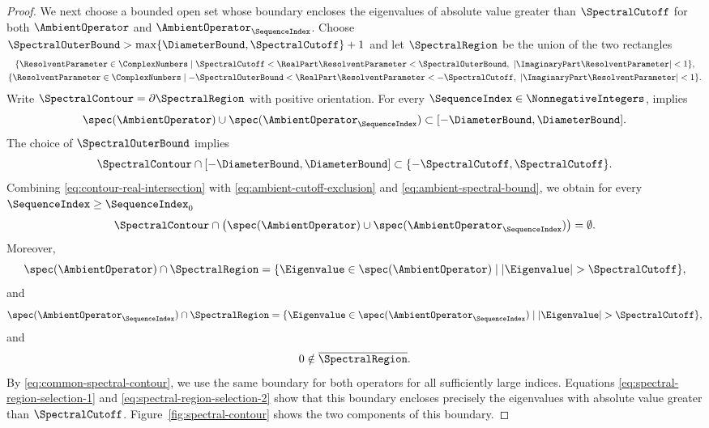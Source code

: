 \begin{proof}
We next choose a bounded open set whose boundary encloses the eigenvalues of absolute
value greater than
$\SpectralCutoff$
for both
$\AmbientOperator$
and
$\AmbientOperator_\SequenceIndex$.
Choose
$\SpectralOuterBound >\max\{\DiameterBound ,\SpectralCutoff \}+1$
and let
$\SpectralRegion $
be the union of the two rectangles
\[
 \begin{gathered}
 \{\ResolventParameter \in\ComplexNumbers\mid \SpectralCutoff <\RealPart \ResolventParameter <\SpectralOuterBound ,\ |\ImaginaryPart \ResolventParameter |<1\},\\
 \{\ResolventParameter \in\ComplexNumbers\mid-\SpectralOuterBound <\RealPart \ResolventParameter <-\SpectralCutoff ,\ |\ImaginaryPart \ResolventParameter |<1\}.
 \end{gathered}
\]
Write
$\SpectralContour =\partial\SpectralRegion $
with positive orientation.
For every
$\SequenceIndex\in\NonnegativeIntegers$,
 implies
\begin{equation}\label{eq:ambient-spectral-bound}
 \spec(\AmbientOperator)\cup\spec(\AmbientOperator_\SequenceIndex)
 \subset[-\DiameterBound,\DiameterBound].
\end{equation}
The choice of
$\SpectralOuterBound$
implies
\begin{equation}\label{eq:contour-real-intersection}
 \SpectralContour\cap[-\DiameterBound,\DiameterBound]
 \subset\{-\SpectralCutoff,\SpectralCutoff\}.
\end{equation}
Combining \eqref{eq:contour-real-intersection} with \eqref{eq:ambient-cutoff-exclusion}
and \eqref{eq:ambient-spectral-bound},
we obtain for every
$\SequenceIndex\geq\SequenceIndex_0$
\begin{equation}\label{eq:common-spectral-contour}
 \SpectralContour\cap
 \bigl(\spec(\AmbientOperator)\cup\spec(\AmbientOperator_\SequenceIndex)\bigr)
 =\emptyset.
\end{equation}
Moreover,
\begin{equation}\label{eq:spectral-region-selection-1}
 \spec(\AmbientOperator)\cap\SpectralRegion
 =\{\Eigenvalue\in\spec(\AmbientOperator)\mid|\Eigenvalue|>\SpectralCutoff\},
\end{equation}
and
\begin{equation}\label{eq:spectral-region-selection-2}
 \spec(\AmbientOperator_\SequenceIndex)\cap\SpectralRegion
 =\{\Eigenvalue\in\spec(\AmbientOperator_\SequenceIndex)\mid|\Eigenvalue|>\SpectralCutoff\},
\end{equation}
and
\begin{equation}\label{eq:spectral-region-selection-3}
 0\notin\overline\SpectralRegion.
\end{equation}
By \eqref{eq:common-spectral-contour},
we use the same boundary for both operators
for all sufficiently large indices.
Equations \eqref{eq:spectral-region-selection-1} and \eqref{eq:spectral-region-selection-2}
show that this boundary encloses precisely the eigenvalues with absolute value
greater than
$\SpectralCutoff$.
Figure~\ref{fig:spectral-contour} shows the two components of this boundary.



\end{proof}
